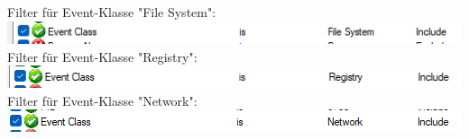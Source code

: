 \documentclass{article}
\begin{document}
	Filter für Event-Klasse "File System":\\
	\includegraphics[width=0.7\linewidth]{"pictures/1.7 event class file"}\\
	Filter für Event-Klasse "Registry":\\
	\includegraphics[width=0.7\linewidth]{"pictures/1.7 event class registry"}\\
	Filter für Event-Klasse "Network":\\
	\includegraphics[width=0.7\linewidth]{"pictures/1.7 event class network"}\\
	
	

	
	\pagebreak
	
\end{document}
